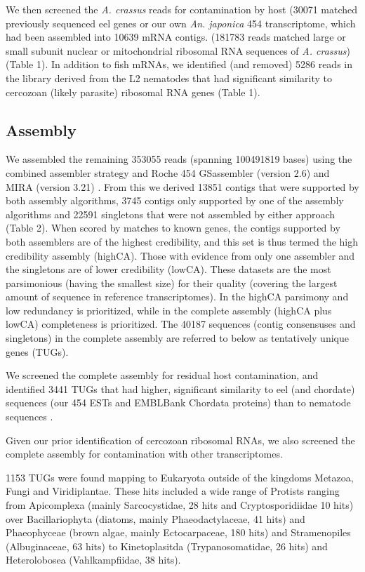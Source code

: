 \documentclass[10pt]{bmc_article}
\newenvironment{bmcformat}{\begin{raggedright}\baselineskip20pt\sloppy\setboolean{publ}{false}}{\end{raggedright}\baselineskip20pt\sloppy}
\begin{document}
\begin{bmcformat}
 We then screened the \textit{A. crassus} reads for contamination by
 host (30071 matched previously sequenced eel genes or our own
 \textit{An. japonica} 454 transcriptome, which had been assembled
 into 10639 mRNA contigs. (181783 reads matched large or small subunit
 nuclear or mitochondrial ribosomal RNA sequences of
 \textit{A. crassus}) (Table 1). In addition to fish mRNAs, we
 identified (and removed) 5286 reads in the library derived from the
 L2 nematodes that had significant similarity to cercozoan (likely
 parasite) ribosomal RNA genes (Table 1).

\subsection*{Assembly}


We assembled the remaining 353055 reads (spanning 100491819 bases)
using the combined assembler strategy \cite{pmid20950480} and Roche
454 GSassembler (version 2.6) and MIRA (version 3.21)
\cite{miraEST}. From this we derived 13851 contigs that were supported
by both assembly algorithms, 3745 contigs only supported by one of the
assembly algorithms and 22591 singletons that were not assembled by
either approach (Table 2). When scored by matches to known genes, the
contigs supported by both assemblers are of the highest credibility,
and this set is thus termed the high credibility assembly
(highCA). Those with evidence from only one assembler and the
singletons are of lower credibility (lowCA). These datasets are the
most parsimonious (having the smallest size) for their quality
(covering the largest amount of sequence in reference
transcriptomes). In the highCA parsimony and low redundancy is
prioritized, while in the complete assembly (highCA plus lowCA)
completeness is prioritized. The 40187 sequences (contig consensuses
and singletons) in the complete assembly are referred to below as
tentatively unique genes (TUGs).




We screened the complete assembly for residual host contamination, and
identified 3441 TUGs that had higher, significant similarity to
eel (and chordate) sequences (our 454 ESTs and EMBLBank Chordata
proteins) than to nematode sequences \cite{pmid21550347}.

Given our prior identification of cercozoan ribosomal RNAs, we also
screened the complete assembly for contamination with other
transcriptomes.

1153 TUGs were found mapping to Eukaryota outside of the kingdoms
Metazoa, Fungi and Viridiplantae. These hits included a wide range of
Protists ranging from Apicomplexa (mainly Sarcocystidae, 28 hits and
Cryptosporidiidae 10 hits) over Bacillariophyta (diatoms, mainly
Phaeodactylaceae, 41 hits) and Phaeophyceae (brown algae, mainly
Ectocarpaceae, 180 hits) and Stramenopiles (Albuginaceae, 63 hits) to
Kinetoplasitda (Trypanosomatidae, 26 hits) and Heterolobosea
(Vahlkampfiidae, 38 hits).


\end{bmcformat}
\end{document}
